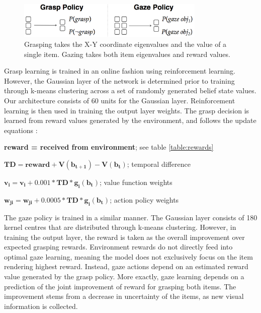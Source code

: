 \documentclass[11]{article}
\begin{document}
\begin{figure}[!h]
	\centering
	\includegraphics[width=0.8\textwidth]{figures/inputoutput.png}
	\caption{Grasping takes the X-Y coordinate eigenvalues and the value of a single item. Gazing takes both item eigenvalues and reward values.}
	\label{fig:inout}
\end{figure}

Grasp learning is trained in an online fashion using reinforcement learning.
However, the Gaussian layer of the network is determined prior to training through k-means clustering across a set of randomly generated belief state values.
Our architecture consists of 60 units for the Gaussian layer. 
Reinforcement learning is then used in training the output layer weights.
The grasp decision is learned from reward values generated by the environment, and follows the update equations : 

\begin{list}{}{}
  \item \textbf{reward = received from environment}; see table \ref{table:rewards}
  \item $\pmb{TD = reward + V(b_{t+1}) - V(b_t)}$; temporal difference
  \item $\pmb{v_i = v_i + 0.001 * TD * g_i(b_t)}$; value function weights
  \item $\pmb{w_{ji} = w_{ji}+ 0.0005 * TD * g_i(b_t)}$; action policy weights
\end{list}  

The gaze policy is trained in a similar manner. 
The Gaussian layer consists of 180 kernel centres that are distributed through k-means clustering. 
However, in training the output layer, the reward is taken as the overall improvement over expected grasping rewards. 
Environment rewards do not directly feed into optimal gaze learning, meaning the model does not exclusively focus on the item rendering highest reward.
Instead, gaze actions depend on an estimated reward value generated by the grasp policy.
More exactly, gaze learning depends on a prediction of the joint improvement of reward for grasping both items.
The improvement stems from a decrease in uncertainty of the items, as new visual information is collected. 
\end{document}
